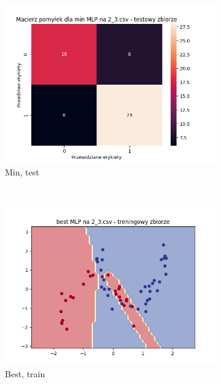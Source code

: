 \documentclass[12pt]{article}
\newcommand*{\subfigwidth}{0.24\textwidth}
\begin{document}
\begin{figure}[H]
\begin{subfigure}[t]{\subfigwidth}
        \includegraphics[width=\linewidth]{img/exp_3/mlp/2_3/min/test_matrix.png}
        \caption{Min, test}
    \end{subfigure}
    \\
    \begin{subfigure}[t]{\subfigwidth}
        \includegraphics[width=\linewidth]{img/exp_3/mlp/2_3/best/train_boundary.png}
        \caption{Best, train}
    \end{subfigure}
    \hfill
    \begin{subfigure}[t]{\subfigwidth}

\end{subfigure}
\end{figure}
\end{document}
